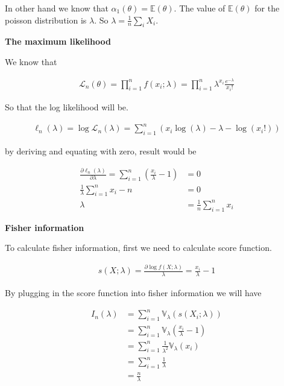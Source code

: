 \documentclass[12pt, a4paper]{book}
\begin{document}
In other hand we know that $\alpha_1(\theta) = \mathbb{E}(\theta)$. The value of $\mathbb{E}(\theta)$ for
the poisson distribution is $\lambda$. So $\lambda = \frac{1}{n} \sum_i X_i$.

\textbf{The maximum likelihood}

We know that

\begin{align*}
    \mathcal{L}_n(\theta) = \prod_{i=1}^{n} f(x_i; \lambda) = \prod_{i=1}^{n} \lambda^{x_i} \frac{e^{-\lambda}}{x_i!}
\end{align*}

So that the log likelihood will be.

\begin{align*}
    \ell_n(\lambda) = \log \mathcal{L}_n{(\lambda)} = \sum_{i=1}^{n} (x_i\log(\lambda) - \lambda - \log(x_i!))
\end{align*}

by deriving and equating with zero, result would be

\begin{align*}
    \frac{\partial \ell_n(\lambda)}{\partial \lambda} = \sum_{i=1}^{n} (\frac{x_i}{\lambda} - 1) & = 0 \\
    \frac{1}{\lambda} \sum_{i=1}^{n} x_i - n & = 0 \\
    \lambda & = \frac{1}{n} \sum_{i=1}^{n} x_i
\end{align*}

\textbf{Fisher information}

To calculate fisher information, first we need to calculate score function.

\begin{align*}
    s(X;\lambda) = \frac{\partial \log f(X;\lambda)}{\lambda} = \frac{x_i}{\lambda} - 1
\end{align*}

By plugging in the score function into fisher information we will have

\begin{align*}
    I_n(\lambda) & = \sum_{i=1}^{n} \mathbb{V}_\lambda (s(X_i;\lambda)) \\
    & = \sum_{i=1}^{n} \mathbb{V}_\lambda (\frac{x_i}{\lambda} - 1) \\
    & = \sum_{i=1}^{n} \frac{1}{\lambda^2} \mathbb{V}_\lambda(x_i) \\
    & = \sum_{i=1}^{n} \frac{1}{\lambda} \\
    & = \frac{n}{\lambda}
\end{align*}
\end{document}
